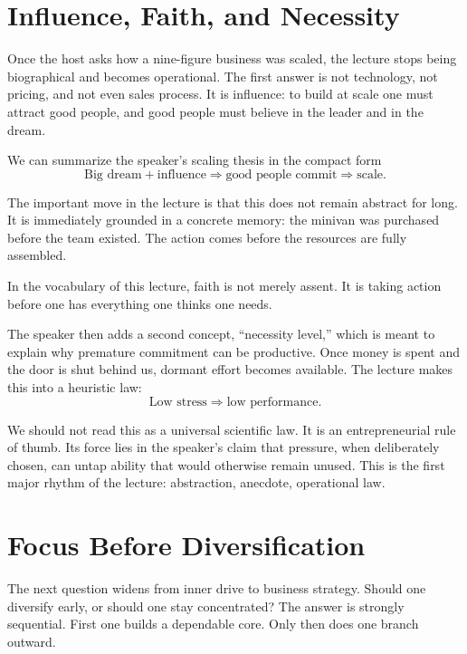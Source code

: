 \section{Influence, Faith, and Necessity}

Once the host asks how a nine-figure business was scaled, the lecture stops being biographical and becomes operational. The first answer is not technology, not pricing, and not even sales process. It is influence: to build at scale one must attract good people, and good people must believe in the leader and in the dream.

We can summarize the speaker's scaling thesis in the compact form
\begin{equation}
\text{Big dream} + \text{influence}
\Longrightarrow
\text{good people commit}
\Longrightarrow
\text{scale}.
\end{equation}

The important move in the lecture is that this does not remain abstract for long. It is immediately grounded in a concrete memory: the minivan was purchased before the team existed. The action comes before the resources are fully assembled.

\begin{definition}
In the vocabulary of this lecture, faith is not merely assent. It is taking action before one has everything one thinks one needs.
\end{definition}

The speaker then adds a second concept, ``necessity level,'' which is meant to explain why premature commitment can be productive. Once money is spent and the door is shut behind us, dormant effort becomes available. The lecture makes this into a heuristic law:
\begin{equation}
\text{Low stress} \Longrightarrow \text{low performance}.
\end{equation}

We should not read this as a universal scientific law. It is an entrepreneurial rule of thumb. Its force lies in the speaker's claim that pressure, when deliberately chosen, can untap ability that would otherwise remain unused. This is the first major rhythm of the lecture: abstraction, anecdote, operational law.

\section{Focus Before Diversification}

The next question widens from inner drive to business strategy. Should one diversify early, or should one stay concentrated? The answer is strongly sequential. First one builds a dependable core. Only then does one branch outward.

